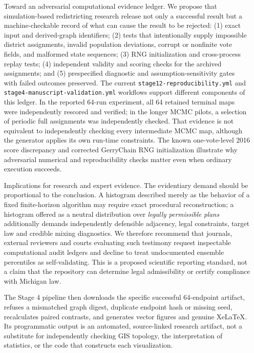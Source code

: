 \documentclass[
  10pt,
]{article}
\begin{document}
Toward an adversarial computational evidence ledger. We propose that
simulation-based redistricting research release not only a successful
result but a machine-checkable record of what can cause the result to be
rejected: (1) exact input and derived-graph identifiers; (2) tests that
intentionally supply impossible district assignments, invalid population
deviations, corrupt or nonfinite vote fields, and malformed state
sequences; (3) RNG initialization and cross-process replay tests; (4)
independent validity and scoring checks for the archived assignments;
and (5) prespecified diagnostic and assumption-sensitivity gates with
failed outcomes preserved. The current
\texttt{stage12-reproducibility.yml} and
\texttt{stage4-manuscript-validation.yml} workflows support different
components of this ledger. In the reported 64-run experiment, all 64
retained terminal maps were independently rescored and verified; in the
longer MCMC pilots, a selection of periodic full assignments was
independently checked. That evidence is not equivalent to independently
checking every intermediate MCMC map, although the generator applies its
own run-time constraints. The known one-vote-level 2016 score
discrepancy and corrected GerryChain RNG initialization illustrate why
adversarial numerical and reproducibility checks matter even when
ordinary execution succeeds.

Implications for research and expert evidence. The evidentiary demand
should be proportional to the conclusion. A histogram described merely
as the behavior of a fixed finite-horizon algorithm may require exact
procedural reconstruction; a histogram offered as a neutral distribution
over \emph{legally permissible plans} additionally demands independently
defensible adjacency, legal constraints, target law and credible mixing
diagnostics. We therefore recommend that journals, external reviewers
and courts evaluating such testimony request inspectable computational
audit ledgers and decline to treat undocumented ensemble percentiles as
self-validating. This is a proposed scientific reporting standard, not a
claim that the repository can determine legal admissibility or certify
compliance with Michigan law.

The Stage 4 pipeline then downloads the specific successful 64-endpoint
artifact, refuses a mismatched graph digest, duplicate endpoint hash or
missing seed, recalculates paired contrasts, and generates vector
figures and genuine XeLaTeX. Its programmatic output is an automated,
source-linked research artifact, not a substitute for independently
checking GIS topology, the interpretation of statistics, or the code
that constructs each visualization.
\end{document}
